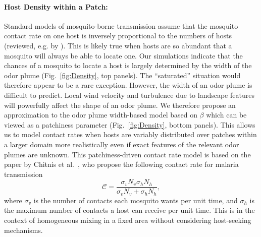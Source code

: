 \documentclass[12pt]{article}
\begin{document}
\paragraph{Host Density within a Patch: } Standard models of mosquito-borne transmission assume that the mosquito contact rate on one host is inversely proportional to the numbers of hosts (reviewed, e.g. by \cite{Wonham2006}). This is likely true when hosts are so abundant that a mosquito will always be able to locate one. Our simulations indicate that the chances of a mosquito to locate a host is largely determined by the width of the odor plume (Fig.~\ref{fig:Density}, top panels). The ``saturated'' situation would therefore appear to be a rare exception. However, the width of an odor plume is difficult to predict. Local wind velocity and turbulence due to landscape features will powerfully affect the shape of an odor plume. We therefore propose an approximation to the odor plume width-based model based on $\beta$ which can be viewed as a patchiness parameter (Fig.~\ref{fig:Density}, bottom panels).
This allows us to model contact rates when hosts are variably distributed over patches within a larger domain more realistically even if exact features of the relevant odor plumes are unknown.
%
This patchiness-driven contact rate model is based on the paper by
Chitnis et al.~\cite{Chitnis2006}, who propose the following contact  rate for malaria transmission
\begin{equation*}
	\mathcal{C} = \frac{\sigma_v N_v\sigma_h N_h}{\sigma_v N_v + \sigma_h N_h},
\end{equation*}
where $\sigma_v$ is the number of contacts each mosquito wants per unit time, and $\sigma_h$ is the maximum number of contacts
a host can receive per unit time. This is in the context of homogeneous mixing in a fixed area without considering
host-seeking mechanisms.
\end{document}
